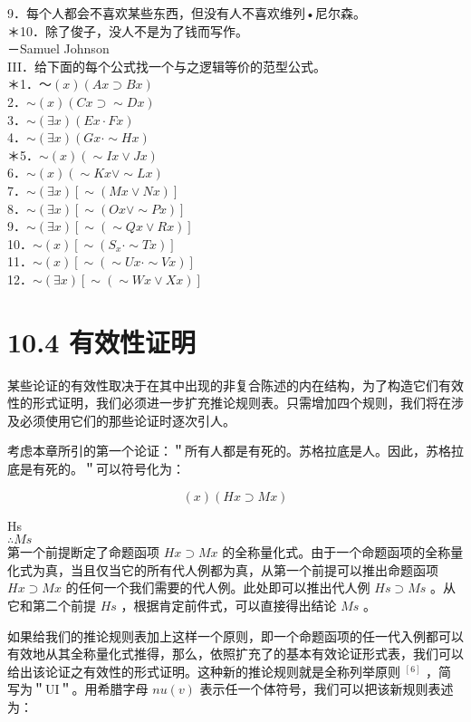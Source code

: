 9．每个人都会不喜欢某些东西，但没有人不喜欢维列•尼尔森。\\
＊10．除了俊子，没人不是为了钱而写作。\\
－Samuel Johnson\\
III．给下面的每个公式找一个与之逻辑等价的范型公式。\\
＊1．～$(x)(A x \supset B x)$\\
2．$\sim(x)(C x \supset \sim D x)$\\
3．$\sim(\exists x)(E x \cdot F x)$\\
4．$\sim(\exists x)(G x \cdot \sim H x)$\\
＊5．$\sim(x)(\sim I x \vee J x)$\\
6．$\sim(x)(\sim K x \vee \sim L x)$\\
7．$\sim(\exists x)[\sim(M x \vee N x)]$\\
8．$\sim(\exists x)[\sim(O x \vee \sim P x)]$\\
9．$\sim(\exists x)[\sim(\sim Q x \vee R x)]$\\
10．$\sim(x)\left[\sim\left(S_{x} \cdot \sim T x\right)\right]$\\
11．$\sim(x)[\sim(\sim U x \cdot \sim V x)]$\\
12．$\sim(\exists x)[\sim(\sim W x \vee X x)]$

\section*{10.4 有效性证明}
某些论证的有效性取决于在其中出现的非复合陈述的内在结构，为了构造它们有效性的形式证明，我们必须进一步扩充推论规则表。只需增加四个规则，我们将在涉及必须使用它们的那些论证时逐次引人。

考虑本章所引的第一个论证：＂所有人都是有死的。苏格拉底是人。因此，苏格拉底是有死的。＂可以符号化为：

$$
(x)(H x \supset M x)
$$

Hs\\
$\therefore M s$\\
第一个前提断定了命题函项 $H x \supset M x$ 的全称量化式。由于一个命题函项的全称量化式为真，当且仅当它的所有代人例都为真，从第一个前提可以推出命题函项 $H x \supset M x$ 的任何一个我们需要的代人例。此处即可以推出代人例 $H s \supset M s$ 。从它和第二个前提 $H s$ ，根据肯定前件式，可以直接得出结论 $M s$ 。

如果给我们的推论规则表加上这样一个原则，即一个命题函项的任一代入例都可以有效地从其全称量化式推得，那么，依照扩充了的基本有效论证形式表，我们可以给出该论证之有效性的形式证明。这种新的推论规则就是全称列举原则 ${ }^{[6]}$ ，简写为＂UI＂。用希腊字母 $n u(v)$ 表示任一个体符号，我们可以把该新规则表述为：

